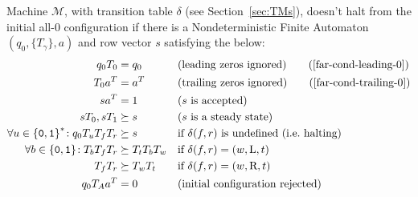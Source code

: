 \begin{theorem}
    \label{far-main-theorem}
    Machine $\mathcal{M}$, with transition table $\delta$ (see Section~\ref{sec:TMs}), doesn't halt from the initial all-0 configuration if there is a Nondeterministic Finite Automaton $(q_0, \{T_\gamma\}, a)$ and row vector $s$ satisfying the below:
    \begin{align}
        \label{far-cond-first}
        q_0 T_0                                    & = q_0
                                                   &                     & \text{(leading zeros ignored)}
        \tag{\ref{far-cond-leading-0}}
        \\
        T_0a\T                                     & = a\T
                                                   &                     & \text{(trailing zeros ignored)}
        \tag{\ref{far-cond-trailing-0}}
        \\
        sa\T                                       & = 1
                                                   &                     & \text{($s$ is accepted)}
        \label{far-cond-ass-accepted}
        \\
        sT_0,sT_1                                  & \succeq s
                                                   &                     & \text{($s$ is a steady state)}
        \label{far-cond-ass-steady}
        \\
        \forall u\in\balphabet^*\!: q_0T_u T_f T_r & \succeq s
                                                   &                     & \text{if $\delta(f,r)$ is undefined (\ie halting)}
        \label{far-cond-halt}
        \\
        \forall b\in\balphabet\!: T_b T_f T_r      & \succeq T_t T_b T_w
                                                   &                     & \text{if $\delta(f,r) = (w,\text{L},t)$}
        \label{far-cond-left}
        \\
        T_f T_r                                    & \succeq T_w T_t
                                                   &                     & \text{if $\delta(f,r) = (w,\text{R},t)$}
        \label{far-cond-last}
        \\
        q_0 T_A a\T                                & = 0
                                                   &                     & \text{(initial configuration rejected)}
        \label{far-cond-reject-start}
    \end{align}
\end{theorem}
